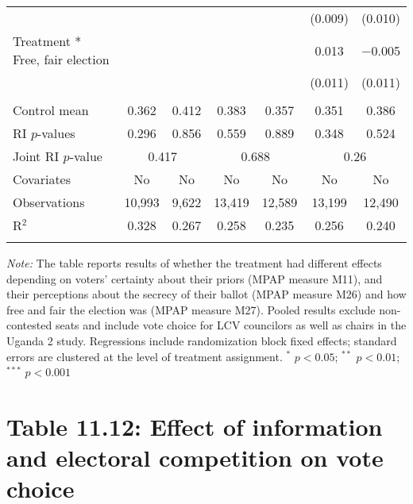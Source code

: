\documentclass[]{article}
\begin{document}
\begin{table}[!htbp]
\begin{tabular}{@{\extracolsep{1pt}}lcccccc}
  &  &  &  &  & (0.009) & (0.010) \\ 
  Treatment * Free, fair election &  &  &  &  & 0.013 & $-$0.005 \\ 
  &  &  &  &  & (0.011) & (0.011) \\ 
 \hline \\[-1.8ex] 
Control mean & 0.362 & 0.412 & 0.383 & 0.357 & 0.351 & 0.386 \\ 
RI $p$-values & 0.296 & 0.856 & 0.559 & 0.889 & 0.348 & 0.524 \\ 
Joint RI $p$-value & \multicolumn{2}{c}{0.417} & \multicolumn{2}{c}{0.688} & \multicolumn{2}{c}{0.26}\\
Covariates & No & No & No & No & No & No \\ 
Observations & 10,993 & 9,622 & 13,419 & 12,589 & 13,199 & 12,490 \\ 
R$^{2}$ & 0.328 & 0.267 & 0.258 & 0.235 & 0.256 & 0.240 \\ 
\hline 
\hline \\[-1.8ex] 
\end{tabular} 
\begin{flushleft}\textit{Note:} The table reports results of whether the treatment had different effects depending on voters' certainty about their priors (MPAP measure M11), and their perceptions about the secrecy of their ballot (MPAP measure M26) and how free and fair the election was (MPAP measure M27). Pooled results exclude non-contested seats and include vote choice for LCV councilors as well as chairs in the Uganda 2 study. Regressions include randomization block fixed effects; standard errors are clustered at the level of treatment assignment. $^{*}$ $p<0.05$; $^{**}$ $p<0.01$; $^{***}$ $p<0.001$ \end{flushleft}
\end{table}

\clearpage

\section{Table 11.12: Effect of information and electoral competition on
vote
choice}\label{table-11.12-effect-of-information-and-electoral-competition-on-vote-choice}
\end{document}
